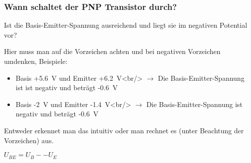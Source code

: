 \begin{frame}
\frametitle{Wann schaltet der PNP Transistor durch?}
Ist die Basis-Emitter-Spannung ausreichend und liegt sie im negativen Potential vor?

Hier muss man auf die Vorzeichen achten und bei negativen Vorzeichen umdenken, Beispiele:

\begin{itemize}
  \item Basis +\qty{5,6}{\volt} und Emitter +\qty{6,2}{\volt}<br/> $\rightarrow$ Die Basis-Emitter-Spannung ist ist negativ und beträgt -\qty{0,6}{\volt}
  \item Basis -\qty{2}{\volt} und Emitter -\qty{1,4}{\volt}<br/> $\rightarrow$ Die Basis-Emitter-Spannung ist negativ und beträgt -\qty{0,6}{\volt}
  \end{itemize}
\end{frame}

\begin{frame}Entweder erkennet man das intuitiv oder man rechnet es (unter Beachtung der Vorzeichen) aus.

$U_{ BE } = U_{ B } -- U_{ E }$

\end{frame}

\begin{frame}
\end{frame}

